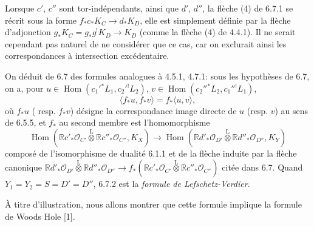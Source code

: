\documentclass[11pt]{article}
\providecommand{\cO}{\mathcal{O}}
\DeclareMathOperator{\Hom}{Hom}
\newcommand{\R}{\mathbb{R}}\newcommand{\RHomCore}{\mathbb{R}\mathrm{Hom}}
\providecommand{\Hom}{\operatorname{Hom}}
\providecommand{\R}{\mathrm R}
\providecommand{\Hom}{\operatorname{Hom}}
\begin{document}
Lorsque $c'$, $c''$ sont tor-indépendants, ainsi que $d'$, $d''$, la flèche (4) de 6.7.1 se récrit sous la forme $f_*c_*K_C\to d_*K_D$, elle est simplement définie par la flèche d'adjonction $g_*K_C=g_*g^!K_D\to K_D$ (comme la flèche (4) de 4.4.1). Il ne serait cependant pas naturel de ne considérer que ce cas, car on exclurait ainsi les correspondances à intersection excédentaire.

On déduit de 6.7 des formules analogues à 4.5.1, 4.7.1: sous les hypothèses de 6.7, on a, pour $u\in\Hom(c_1'{}^*L_1,c_2'{}^!L_2)$, $v\in\Hom(c_2''{}^*L_2,c_1''{}^!L_1)$,
\begin{equation}
\tag{6.7.2}
\langle f_*u,f_*v\rangle=f_*\langle u,v\rangle,
\end{equation}
où $f_*u$ (
resp. $f_*v$) désigne la correspondance image directe de $u$ (resp. $v$) au sens de 6.5.5, et $f_*$ au second membre est l'homomorphisme
\begin{equation}
\tag{6.7.3}
\Hom(\R c'_*\cO_{C'}\overset{\mathrm{L}}{\otimes}\R c''_*\cO_{C''},K_X)
\longrightarrow
\Hom(\R d'_*\cO_{D'}\overset{\mathrm{L}}{\otimes}\R d''_*\cO_{D''},K_Y)
\end{equation}
composé de l'isomorphisme de dualité 6.1.1 et de la flèche induite par la flèche canonique $\R d'_*\cO_{D'}\overset{\mathrm{L}}{\otimes}\R d''_*\cO_{D''}\longrightarrow f_*(\R c'_*\cO_{C'}\overset{\mathrm{L}}{\otimes}\R c''_*\cO_{C''})$ citée dans 6.7. Quand $Y_1=Y_2=S=D'=D''$, 6.7.2 est la \emph{formule de Lefschetz-Verdier}.

À titre d'illustration, nous allons montrer que cette formule implique la formule de Woods Hole [1].
\end{document}
